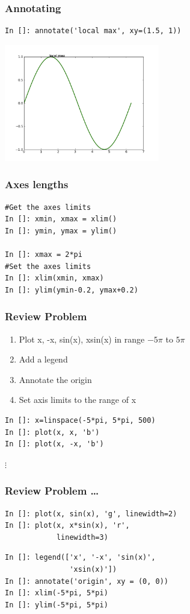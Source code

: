 \documentclass[14pt,compress]{beamer}
\begin{document}
\begin{frame}[fragile]
\frametitle{Annotating}
\vspace*{-0.15in}
\begin{lstlisting}
In []: annotate('local max', xy=(1.5, 1))
\end{lstlisting}
\vspace*{-0.2in}
\begin{center}
  \includegraphics[height=2in, interpolate=true]{data/annotate}  
\end{center}
\end{frame}

\begin{frame}[fragile]
\frametitle{Axes lengths}
  \begin{lstlisting}
#Get the axes limits
In []: xmin, xmax = xlim() 
In []: ymin, ymax = ylim() 

In []: xmax = 2*pi
#Set the axes limits
In []: xlim(xmin, xmax) 
In []: ylim(ymin-0.2, ymax+0.2) 
  \end{lstlisting}
\end{frame}

\begin{frame}[fragile]
\frametitle{Review Problem}
\begin{enumerate}
\item Plot x, -x, sin(x), xsin(x) in range $-5\pi$ to $5\pi$
\item Add a legend
\item Annotate the origin
\item Set axis limits to the range of x
\end{enumerate}
\begin{lstlisting}
In []: x=linspace(-5*pi, 5*pi, 500)
In []: plot(x, x, 'b')
In []: plot(x, -x, 'b')
\end{lstlisting}
$\vdots$
\end{frame}

\begin{frame}[fragile]
\frametitle{Review Problem \ldots}
\begin{lstlisting}
In []: plot(x, sin(x), 'g', linewidth=2)
In []: plot(x, x*sin(x), 'r', 
            linewidth=3)
\end{lstlisting}
\begin{lstlisting}
In []: legend(['x', '-x', 'sin(x)', 
               'xsin(x)'])
In []: annotate('origin', xy = (0, 0))
In []: xlim(-5*pi, 5*pi)
In []: ylim(-5*pi, 5*pi)
\end{lstlisting}
\end{frame}
\end{document}
